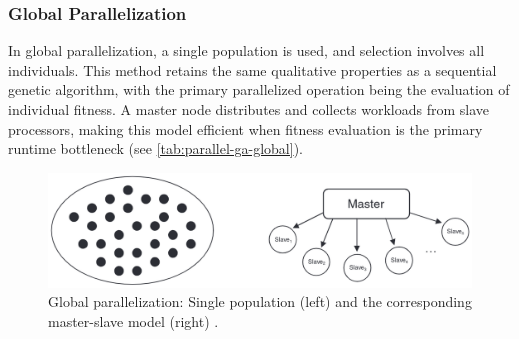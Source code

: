 \documentclass[sigconf]{acmart}
\begin{document}
\subsubsection{Global Parallelization}
In global parallelization, a single population is used, and selection involves
all individuals. This method retains the same qualitative properties as a
sequential genetic algorithm, with the primary parallelized operation being the
evaluation of individual fitness. A master node distributes and collects
workloads from slave processors, making this model efficient when fitness
evaluation is the primary runtime bottleneck
(see \autoref{tab:parallel-ga-global})\cite{Affenzeller2009}.
\begin{figure}[h]
  \includegraphics[scale=0.22]{assets/parallel-ga-global.png}
  \caption{
    Global parallelization: Single population (left) and the corresponding
    master-slave model (right) \cite{Affenzeller2009}.
  }
  \label{tab:parallel-ga-global}
\end{figure}
\end{document}
